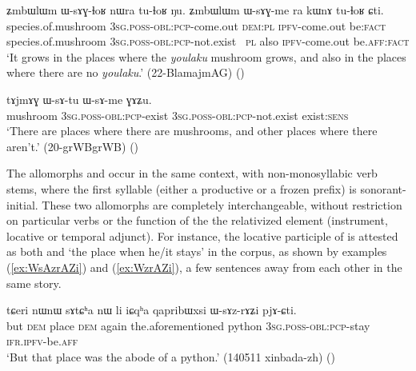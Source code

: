 \begin{exe}
\ex \label{ex:WsAGme}
\gll ʑmbɯlɯm ɯ-sɤɣ-ɬoʁ nɯra tu-ɬoʁ ŋu. ʑmbɯlɯm ɯ-sɤɣ-me ra kɯnɤ tu-ɬoʁ ɕti. \\
species.of.mushroom \textsc{3sg}.\textsc{poss}-\textsc{obl}:\textsc{pcp}-come.out \textsc{dem}:\textsc{pl} \textsc{ipfv}-come.out be:\textsc{fact} species.of.mushroom \textsc{3sg}.\textsc{poss}-\textsc{obl}:\textsc{pcp}-not.exist \ \textsc{pl} also \textsc{ipfv}-come.out be.\textsc{aff}:\textsc{fact} \\
\glt `It grows in the places where the \textit{youlaku} mushroom grows, and also in the places where there are no \textit{youlaku}.'  (22-BlamajmAG)
()
\end{exe}

 \begin{exe}
\ex \label{ex:WsAme}
\gll tɤjmɤɣ ɯ-sɤ-tu ɯ-sɤ-me ɣɤʑu. \\
mushroom \textsc{3sg}.\textsc{poss}-\textsc{obl}:\textsc{pcp}-exist  \textsc{3sg}.\textsc{poss}-\textsc{obl}:\textsc{pcp}-not.exist  exist:\textsc{sens} \\
\glt `There are places where there are mushrooms, and other places where there aren't.' (20-grWBgrWB) ()
\end{exe}

The allomorphs  and  occur in the same context, with non-monosyllabic verb stems, where the first syllable (either a productive or a frozen prefix) is sonorant-initial. These two allomorphs are completely interchangeable, without restriction on particular verbs or the function of the the relativized element (instrument, locative or temporal adjunct). For instance, the locative participle of  is attested as both  and  `the place when he/it stays' in the corpus, as shown by examples (\ref{ex:WsAzrAZi}) and (\ref{ex:WzrAZi}), a few sentences away from each other in the same story.

\begin{exe}
\ex \label{ex:WsAzrAZi}
\gll  tɕeri nɯnɯ sɤtɕʰa nɯ li iɕqʰa qapribɯxsi ɯ-sɤz-rɤʑi pjɤ-ɕti. \\
but \textsc{dem} place \textsc{dem} again the.aforementioned python \textsc{3sg}.\textsc{poss}-\textsc{obl}:\textsc{pcp}-stay \textsc{ifr}.\textsc{ipfv}-be.\textsc{aff} \\
\glt `But that place was the abode of a python.' (140511 xinbada-zh)
()
\end{exe}

